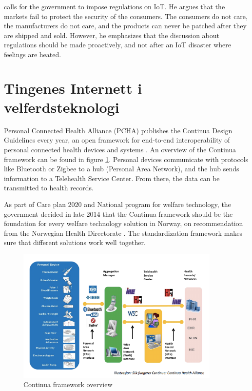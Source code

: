 \citet{iot_schneier_regulation} calls for the government to impose regulations on IoT. He argues that
the markets fail to protect the security of the consumers. The consumers do not care, the manufacturers
do not care, and the products can never be patched after they are shipped and sold. However,
he emphasizes that the discussion about regulations should be made proactively, and not
after an IoT disaster where feelings are heated.

\section{Tingenes Internett i velferdsteknologi}
Personal Connected Health Alliance (PCHA) publishes the Continua Design Guidelines every year,
an open framework for end-to-end interoperability of personal connected health devices and systems \citep{continua_guidelines}.
An overview of the Continua framework can be found in figure \ref{fig:continua}. Personal devices
communicate with protocols like Bluetooth or Zigbee to a hub (Personal Area Network), and the hub sends information
to a Telehealth Service Center. From there, the data can be transmitted to health records.


As part of Care plan 2020 and National program for welfare technology, the government decided
in late 2014 that the Continua framework should be the foundation for every
welfare technology solution in Norway, on recommendation from the Norwegian Health Directorate \citep{regjeringen_continua}.
The standardization framework makes sure that different solutions work well together.

\begin{figure}
\includegraphics[width=0.9\textwidth,center]{fig/continua}
\caption{Continua framework overview}
\label{fig:continua}
\end{figure}
